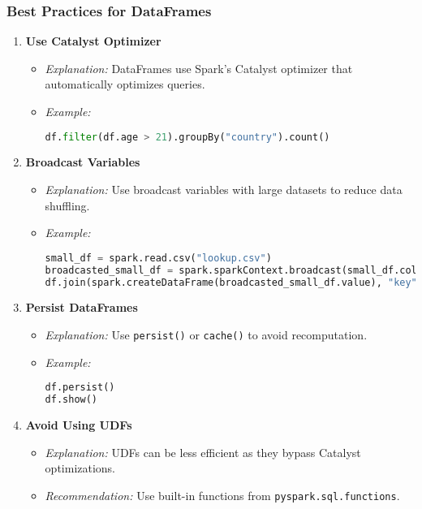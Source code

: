 \documentclass[aspectratio=169]{beamer}
\begin{document}
\begin{frame}[fragile]
    \frametitle{Best Practices for DataFrames}
    \begin{enumerate}
        \item \textbf{Use Catalyst Optimizer}
        \begin{itemize}
            \item \textit{Explanation:} DataFrames use Spark's Catalyst optimizer that automatically optimizes queries.
            \item \textit{Example:}\\
            \begin{lstlisting}[language=Python]
df.filter(df.age > 21).groupBy("country").count()
            \end{lstlisting}
        \end{itemize}
        
        \item \textbf{Broadcast Variables}
        \begin{itemize}
            \item \textit{Explanation:} Use broadcast variables with large datasets to reduce data shuffling.
            \item \textit{Example:}\\
            \begin{lstlisting}[language=Python]
small_df = spark.read.csv("lookup.csv")
broadcasted_small_df = spark.sparkContext.broadcast(small_df.collect())
df.join(spark.createDataFrame(broadcasted_small_df.value), "key")
            \end{lstlisting}
        \end{itemize}
        
        \item \textbf{Persist DataFrames}
        \begin{itemize}
            \item \textit{Explanation:} Use \texttt{persist()} or \texttt{cache()} to avoid recomputation.
            \item \textit{Example:}\\
            \begin{lstlisting}[language=Python]
df.persist()
df.show()
            \end{lstlisting}
        \end{itemize}

        \item \textbf{Avoid Using UDFs}
        \begin{itemize}
            \item \textit{Explanation:} UDFs can be less efficient as they bypass Catalyst optimizations.
            \item \textit{Recommendation:} Use built-in functions from \texttt{pyspark.sql.functions}.
        \end{itemize}
    \end{enumerate}
\end{frame}
\end{document}
